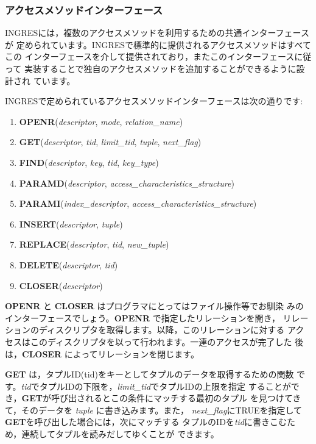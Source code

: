 \subsubsection{アクセスメソッドインターフェース}


INGRESには，複数のアクセスメソッドを利用するための共通インターフェースが
定められています。INGRESで標準的に提供されるアクセスメソッドはすべてこの
インターフェースを介して提供されており，またこのインターフェースに従って
実装することで独自のアクセスメソッドを追加することができるように設計され
ています。


INGRESで定められているアクセスメソッドインターフェースは次の通りです:
\begin{enumerate}
 \item {\bf OPENR}({\it descriptor}, {\it mode}, {\it relation\_name})
 \item {\bf GET}({\it descriptor}, {\it tid}, {\it limit\_tid}, {\it
       tuple}, {\it next\_flag})
 \item {\bf FIND}({\it descriptor}, {\it key}, {\it tid}, {\it key\_type})
 \item {\bf PARAMD}({\it descriptor}, {\it access\_characteristics\_structure})
 \item {\bf PARAMI}({\it index\_descriptor}, {\it access\_characteristics\_structure})
 \item {\bf INSERT}({\it descriptor}, {\it tuple})
 \item {\bf REPLACE}({\it descriptor}, {\it tid}, {\it new\_tuple})
 \item {\bf DELETE}({\it descriptor}, {\it tid})
 \item {\bf CLOSER}({\it descriptor})
\end{enumerate}
{\bf OPENR} と {\bf CLOSER} はプログラマにとってはファイル操作等でお馴染
みのインターフェースでしょう。{\bf OPENR} で指定したリレーションを開き，
リレーションのディスクリプタを取得します。以降，このリレーションに対する
アクセスはこのディスクリプタを以って行われます。一連のアクセスが完了した
後は，{\bf CLOSER} によってリレーションを閉じます。


{\bf GET} は，タプルID(tid)をキーとしてタプルのデータを取得するための関数
です。{\it tid}でタプルIDの下限を，{\it limit\_tid}でタプルIDの上限を指定
することができ，{\bf GET}が呼び出されるとこの条件にマッチする最初のタプル
を見つけてきて，そのデータを {\it tuple} に書き込みます。また，{\it
next\_flag}にTRUEを指定して{\bf GET}を呼び出した場合には，次にマッチする
タプルのIDを{\it tid}に書きこむため，連続してタプルを読みだしてゆくことが
できます。


